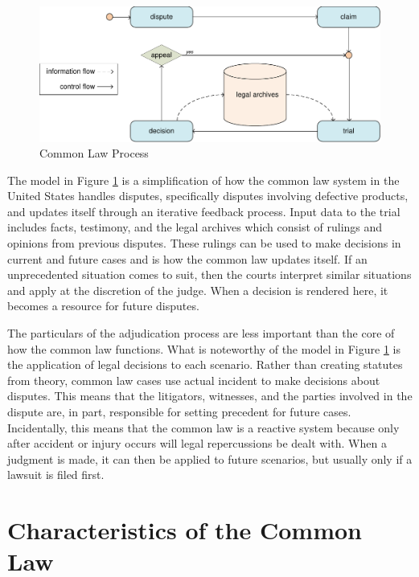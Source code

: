 \documentclass[12pt]{report}
\begin{document}
\begin{figure}[t] 
\begin{center} 
\includegraphics[scale=0.73]{figures/commonlaw.pdf} 
\end{center} 
\caption{Common Law Process} 
\label{fig:commonlaw} 
\end{figure} 

The model in Figure \ref{fig:commonlaw} is a simplification of how the common law system in the United States handles disputes, specifically disputes involving defective products, and updates itself through an iterative feedback process. Input data to the trial includes facts, testimony, and the legal archives which consist of rulings and opinions from previous disputes. These rulings can be used to make decisions in current and future cases and is how the common law updates itself. If an unprecedented situation comes to suit, then the courts interpret similar situations and apply at the discretion of the judge. When a decision is rendered here, it becomes a resource for future disputes.

The particulars of the adjudication process are less important than the core of how the common law functions. What is noteworthy of the model in Figure \ref{fig:commonlaw} is the application of legal decisions to each scenario. Rather than creating statutes from theory, common law cases use actual incident to make decisions about disputes. This means that the litigators, witnesses, and the parties involved in the dispute are, in part, responsible for setting precedent for future cases. Incidentally, this means that the common law is a reactive system because only after accident or injury occurs will legal repercussions be dealt with. When a judgment is made, it can then be applied to future scenarios, but usually only if a lawsuit is filed first. 

\section{Characteristics of the Common Law} 
\end{document}
